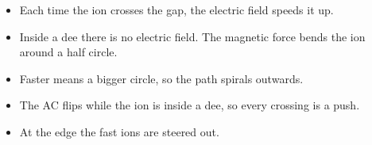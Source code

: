 \begin{sidebyside}[0.47]
  \label{ch5:fig:cyclotron}
\nextside
  \begin{itemize}
    \item Each time the ion crosses the gap, the electric field speeds it up.
    \item Inside a dee there is no electric field. The magnetic force bends the ion
          around a half circle.
    \item Faster means a bigger circle, so the path spirals outwards.
    \item The AC flips while the ion is inside a dee, so every crossing is a push.
    \item At the edge the fast ions are steered out.
  \end{itemize}
\end{sidebyside}

